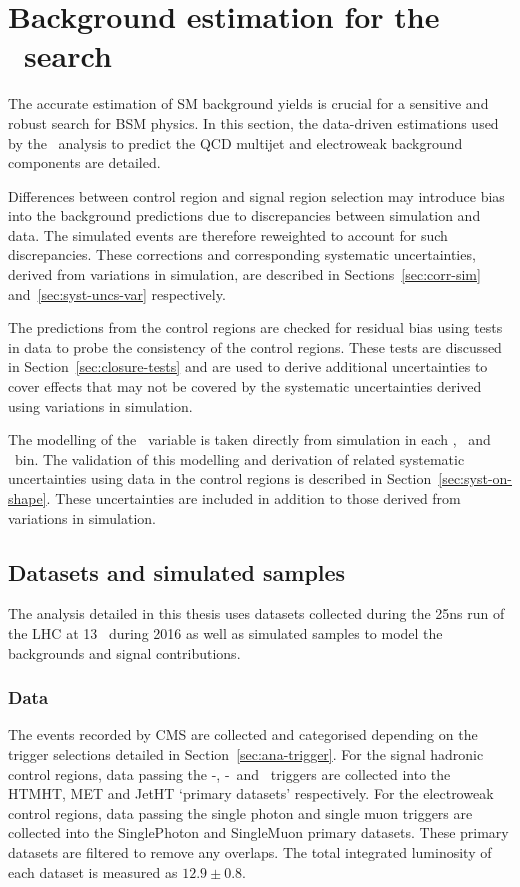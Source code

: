 \chapter{Background estimation for the \alphat~search}
\label{cha:backgroundPrediction}

The accurate estimation of SM background yields is crucial for a sensitive and robust
search for BSM physics. In this section, the data-driven estimations used by
the \alphat~analysis to predict the QCD multijet and electroweak 
background components are detailed. 

Differences between control region and signal 
region selection may introduce bias into the background predictions
due to discrepancies between simulation and data. 
The simulated events are therefore reweighted to account for such discrepancies.
These corrections and corresponding systematic uncertainties, derived
from variations in simulation, are described in Sections~\ref{sec:corr-sim} 
and~\ref{sec:syst-uncs-var} respectively.  

The predictions from the control regions are checked for residual bias 
using tests in data to probe the consistency of the control regions. 
These tests are discussed in Section~\ref{sec:closure-tests} and 
are used to derive additional uncertainties to cover effects 
that may not be covered by the systematic uncertainties derived 
using variations in simulation.

The modelling of the \mht~variable is taken directly from simulation in each \nj, \nb~and \scalht~bin. The validation of this modelling 
and derivation of related systematic uncertainties using data in the 
control regions is described in Section~\ref{sec:syst-on-shape}. These uncertainties 
are included in addition to those derived from variations in simulation.

\section{Datasets and simulated samples}

The analysis detailed in this thesis uses datasets collected during the 25ns run of the 
LHC at 13 \TeV~during 2016 as well as simulated samples to model the backgrounds and
signal contributions.

\subsection{Data}
The events recorded by CMS are collected and categorised depending on the trigger selections
detailed in Section~\ref{sec:ana-trigger}. For the signal hadronic control regions, data passing the \alphat-\scalht,
\mht-\met~and \scalht~triggers are collected into the HTMHT, MET and JetHT `primary datasets' respectively.
For the electroweak control regions, data passing the single photon and single muon triggers are collected 
into the SinglePhoton and SingleMuon primary datasets. These primary datasets are filtered to remove
any overlaps. The total integrated luminosity of each dataset is measured as $12.9\pm0.8$\ifb.

